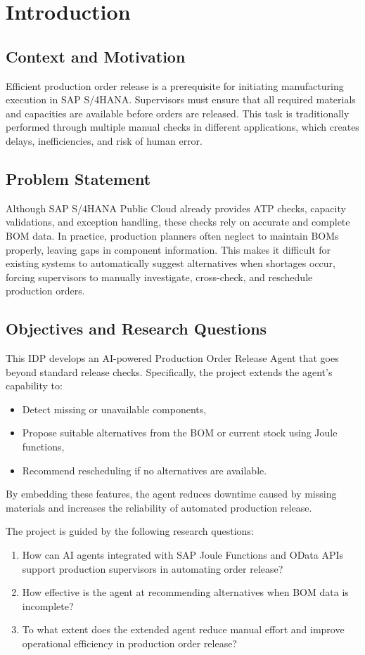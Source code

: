 \chapter{Introduction}
\label{sec:Introduction}

\section{Context and Motivation}
Efficient production order release is a prerequisite for initiating manufacturing execution in SAP S/4HANA. Supervisors must ensure that all required materials and capacities are available before orders are released. This task is traditionally performed through multiple manual checks in different applications, which creates delays, inefficiencies, and risk of human error.

\section{Problem Statement}
Although SAP S/4HANA Public Cloud already provides ATP checks, capacity validations, and exception handling, these checks rely on accurate and complete BOM data. In practice, production planners often neglect to maintain BOMs properly, leaving gaps in component information. This makes it difficult for existing systems to automatically suggest alternatives when shortages occur, forcing supervisors to manually investigate, cross-check, and reschedule production orders.

\section{Objectives and Research Questions}
This IDP develops an AI-powered Production Order Release Agent that goes beyond standard release checks. Specifically, the project extends the agent’s capability to:
\begin{itemize}
  \item Detect missing or unavailable components,
  \item Propose suitable alternatives from the BOM or current stock using Joule functions,
  \item Recommend rescheduling if no alternatives are available.
\end{itemize}

By embedding these features, the agent reduces downtime caused by missing materials and increases the reliability of automated production release.

The project is guided by the following research questions:
\begin{enumerate}
  \item How can AI agents integrated with SAP Joule Functions and OData APIs support production supervisors in automating order release?
  \item How effective is the agent at recommending alternatives when BOM data is incomplete?
  \item To what extent does the extended agent reduce manual effort and improve operational efficiency in production order release?
\end{enumerate}

